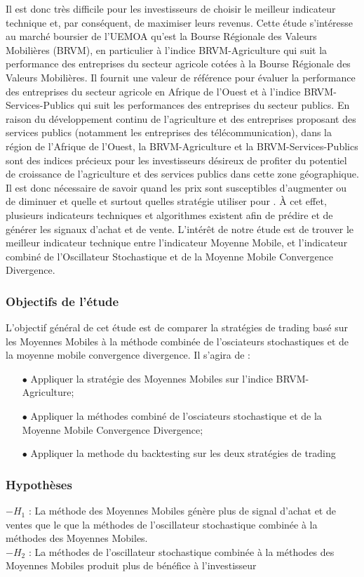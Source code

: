 {Il est donc très difficile pour les investisseurs de choisir le meilleur indicateur technique 
et, par conséquent, de maximiser leurs revenus. Cette étude s'intéresse au marché boursier de l'UEMOA
qu’est la Bourse Régionale des Valeurs Mobilières (BRVM), 
en particulier à l'indice BRVM-Agriculture qui suit la performance des entreprises du secteur agricole cotées à la Bourse Régionale des Valeurs Mobilières. Il fournit une valeur de référence pour évaluer 
la performance des entreprises du secteur agricole en Afrique de l'Ouest et à l'indice 
BRVM-Services-Publics qui suit les performances des entreprises du secteur publics. En raison du développement 
continu de l'agriculture et des entreprises proposant des services publics (notamment les entreprises des 
télécommunication), dans la région de l'Afrique de l'Ouest, la BRVM-Agriculture  et la BRVM-Services-Publics 
sont des indices précieux pour les investisseurs désireux de profiter du potentiel de croissance de 
l'agriculture et des services publics dans cette zone géographique.
Il est donc nécessaire de savoir quand les prix sont susceptibles d'augmenter ou de diminuer et quelle 
et surtout quelles stratégie utiliser pour . À cet effet, 
plusieurs indicateurs techniques et algorithmes existent afin de prédire et de générer les signaux d'achat
et de vente. L'intérêt de notre étude est de trouver le meilleur indicateur technique entre l'indicateur 
Moyenne Mobile, et l'indicateur combiné de l'Oscillateur Stochastique et de la Moyenne Mobile 
Convergence Divergence.

 }

\subsubsection{Objectifs de l'étude}
L'objectif général de cet étude est de comparer la stratégies de trading basé sur les
Moyennes Mobiles à la méthode combinée de l'osciateurs stochastiques et de la moyenne 
mobile convergence divergence.
Il s'agira de :
\begin{itemize}
	\item[$\bullet$]{Appliquer la stratégie des Moyennes Mobiles sur l'indice BRVM-Agriculture;}
	\item[$\bullet$]{Appliquer la méthodes combiné de l'osciateurs stochastique et de
		la Moyenne Mobile Convergence Divergence;}
	\item[$\bullet$]{Appliquer la methode du backtesting sur les deux stratégies de 
	trading}
\end{itemize}
	

\subsubsection{Hypothèses}

$-H_1${ : La méthode des Moyennes Mobiles génère plus de signal 
d'achat et de ventes que le que la méthodes de l'oscillateur stochastique 
combinée à la méthodes des Moyennes Mobiles. }\\
$-H_2${ : La méthodes de l'oscillateur stochastique combinée à la méthodes
des Moyennes Mobiles produit plus de bénéfice à l'investisseur }\\
